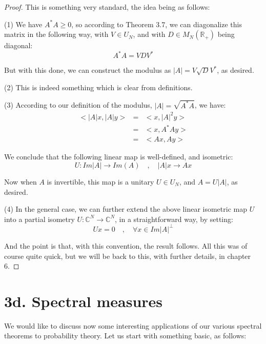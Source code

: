 \documentclass[12pt]{amsbook}
\begin{document}
\begin{proof}
This is something very standard, the idea being as follows:

\medskip

(1) We have $A^*A\geq0$, so according to Theorem 3.7, we can diagonalize this matrix in the following way, with $V\in U_N$, and with $D\in M_N(\mathbb R_+)$ being diagonal:
$$A^*A=VDV^*$$

But with this done, we can construct the modulus as $|A|=V\sqrt{D}V^*$, as desired.

\medskip

(2) This is indeed something which is clear from definitions.

\medskip

(3) According to our definition of the modulus, $|A|=\sqrt{A^*A}$, we have:
\begin{eqnarray*}
<|A|x,|A|y>
&=&<x,|A|^2y>\\
&=&<x,A^*Ay>\\
&=&<Ax,Ay>
\end{eqnarray*}

We conclude that the following linear map is well-defined, and isometric:
$$U:Im|A|\to Im(A)\quad,\quad 
|A|x\to Ax$$

Now when $A$ is invertible, this map is a unitary $U\in U_N$, and $A=U|A|$, as desired.

\medskip

(4) In the general case, we can further extend the above linear isometric map $U$ into a partial isometry $U:\mathbb C^N\to\mathbb C^N$, in a straightforward way, by setting:
$$Ux=0\quad,\quad\forall x\in Im|A|^\perp$$

And the point is that, with this convention, the result follows. All this was of course quite quick, but we will be back to this, with further details, in chapter 6.
\end{proof}

\section*{3d. Spectral measures}

We would like to discuss now some interesting applications of our various spectral theorems to probability theory. Let us start with something basic, as follows:

\end{document}
